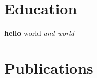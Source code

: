 \documentclass{oneycv}
\begin{document}
\section{Education}
\textbf{hello} world \textit{and world}
\section{Publications}
\end{document}
